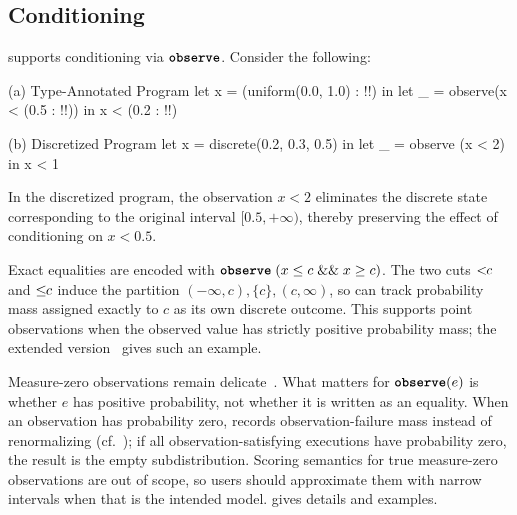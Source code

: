\subsection{Conditioning}\label{sec:examples:6}

\Slice{} supports conditioning via $\textnormal{\ttfamily\bfseries observe}$. Consider the following: %

%

\begin{tcbraster}[
    raster columns=5,
    raster equal height=rows,
    raster before skip=1.5em,
    raster after skip=1.5em,
    raster column skip=0.8em]
    \begin{programpanel}[raster multicolumn=3]{(a) Type-Annotated Program}
let x =
 (uniform(0.0, 1.0) : !{}!) in
let _ =
 observe(x < (0.5 : !{}!)) in
x < (0.2 : !{}!)
    \end{programpanel}
    \begin{programpanel}[raster multicolumn=2]{(b) Discretized Program}
let x = discrete(0.2, 0.3, 0.5) in
let _ = observe (x < 2) in x < 1
    \end{programpanel}
\end{tcbraster}
\label{fig:examples:6}

\noindent
In the discretized program, the observation $x<2$ eliminates the discrete state corresponding to the original interval $[0.5,+\infty)$, thereby preserving the effect of conditioning on $x<0.5$.

Exact equalities are encoded with $\textnormal{\ttfamily\bfseries observe}\; (x \leq c \mathrel{\&\&} x \geq c)$. The two cuts $<\!\!{c}$ and $\leq\!\!{c}$ induce the partition $(-\infty,c), \{c\}, (c,\infty)$, so \Slice{} can track probability mass assigned exactly to $c$ as its own discrete outcome. This supports point observations when the observed value has strictly positive probability mass; the extended version~\cite[\S~A.3]{Wu2026SliceExtended} gives such an example.

Measure-zero observations remain delicate~\cite{Jacobs2021ParadoxesProbProg}. What matters for $\textnormal{\ttfamily\bfseries observe}(e)$ is whether $e$ has positive probability, not whether it is written as an equality. When an observation has probability zero, \Slice{} records observation-failure mass instead of renormalizing (cf.\ ); if all observation-satisfying executions have probability zero, the result is the empty subdistribution. Scoring semantics for true measure-zero observations are out of scope, so users should approximate them with narrow intervals when that is the intended model. \cite[\S~A.4]{Wu2026SliceExtended} gives details and examples.



